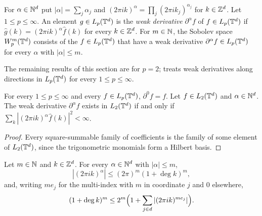 \begin{definition}
\label{def:weak-derivative}
\leanok
For $\alpha \in \mathbb{N}^d$ put $|\alpha| = \sum_j \alpha_j$ and $(2\pi i k)^\alpha = \prod_j
(2\pi i k_j)^{\alpha_j}$ for $k \in \mathbb{Z}^d$. Let $1 \leq p \leq \infty$. An element
$g \in L_p(\mathbb{T}^d)$ is the \emph{weak derivative} $\partial^\alpha f$ of $f \in L_p(\mathbb{T}^d)$ if
$\hat g(k) = (2\pi i k)^\alpha \hat f(k)$ for every $k \in \mathbb{Z}^d$. For $m \in \mathbb{N}$, the Sobolev
space $W^{m}_{p}(\mathbb{T}^d)$ consists of the $f \in L_p(\mathbb{T}^d)$ that have a weak derivative
$\partial^\alpha f \in L_p(\mathbb{T}^d)$ for every $\alpha$ with $|\alpha| \leq m$.
\end{definition}

The remaining results of this section are for $p = 2$;  treats weak
derivatives along directions in $L_p(\mathbb{T}^d)$ for every $1 \leq p \leq \infty$.

\begin{lemma}
\label{lem:weak-derivative}
\leanok
{}
For every $1 \leq p \leq \infty$ and every $f \in L_p(\mathbb{T}^d)$, $\partial^0 f = f$. Let
$f \in L_2(\mathbb{T}^d)$ and $\alpha \in \mathbb{N}^d$. The weak derivative $\partial^\alpha f$ exists in
$L_2(\mathbb{T}^d)$ if and only if $\sum_k |(2\pi i k)^\alpha \hat f(k)|^2 < \infty$.
\end{lemma}

\begin{proof}
\leanok
Every square-summable family of coefficients is the family of some element of $L_2(\mathbb{T}^d)$,
since the trigonometric monomials form a Hilbert basis.
\end{proof}

\begin{lemma}
\label{lem:symbol-bounds}
\leanok
{}
Let $m \in \mathbb{N}$ and $k \in \mathbb{Z}^d$. For every $\alpha \in \mathbb{N}^d$ with $|\alpha| \leq m$,
\[
  |(2\pi i k)^\alpha| \leq (2\pi)^m (1 + \deg k)^m ,
\]
and, writing $m e_j$ for the multi-index with $m$ in coordinate $j$ and $0$ elsewhere,
\[
  (1 + \deg k)^m \leq 2^m \Bigl(1 + \sum_{j \in d} |(2\pi i k)^{m e_j}|\Bigr) .
\]
\end{lemma}

